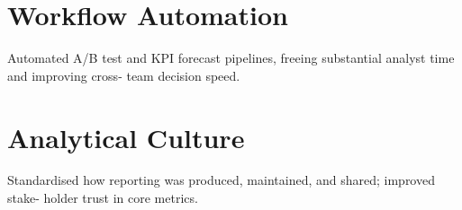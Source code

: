 \section{\large \faGem Workflow Automation}
Automated A/B test and KPI forecast pipelines, freeing substantial analyst time and improving cross- team decision speed.
%
\section{\large \faGem Analytical Culture}
Standardised how reporting was produced, maintained, and shared; improved stake- holder trust in core metrics.
